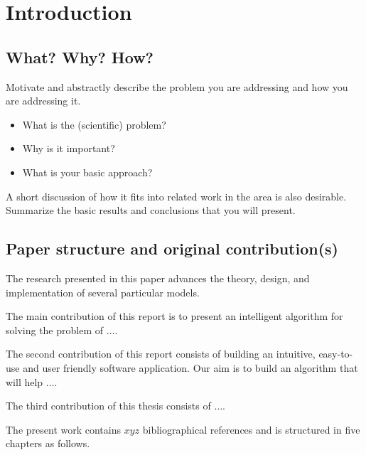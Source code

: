 \documentclass[runningheads,a4paper,11pt]{report}
\begin{document}
\tableofcontents

\newpage

\listoftables
\listoffigures
\listofalgorithms

\newpage




\newpage



\chapter{Introduction}
\label{chapter:introduction}

\section{What? Why? How?}
\label{section:what}

Motivate and abstractly describe the problem you are addressing and how you are addressing it. 
\begin{itemize}
	\item What is the (scientific) problem? 
	\item Why is it important? 
	\item What is your basic approach? 
\end{itemize}

A short discussion of how it fits into related work in the area is also desirable. Summarize the basic results and conclusions that you will present. 

\section{Paper structure and original contribution(s)}
\label{section:structure}

The research presented in this paper advances the theory, design, and implementation of several particular models. 

The main contribution of this report is to present an intelligent algorithm for solving the problem of $\ldots$.

The second contribution of this report consists of building an intuitive, easy-to-use and user
friendly software application. Our aim is to build an algorithm that will help $\ldots$.

The third contribution of this thesis consists of $\ldots$.

The present work contains $xyz$ bibliographical references and is structured in five chapters as follows.
\end{document}
